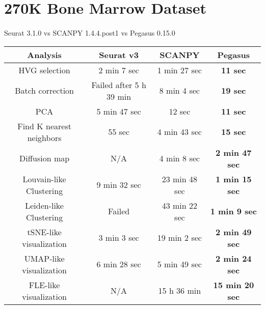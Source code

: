 \documentclass[10pt]{article}
\begin{document}
\section{270K Bone Marrow Dataset}

\paragraph{}
Seurat 3.1.0 \qquad vs \qquad SCANPY 1.4.4.post1 \qquad vs \qquad Pegasus 0.15.0

\begin{table}[H]
	\centering
	\begin{tabular}{|c|c|c|c|}
		\hline
		Analysis & Seurat v3 & SCANPY & Pegasus\\
		\hline \hline
		HVG selection & 2 min 7 sec & 1 min 27 sec & \textbf{11 sec} \\
		\hline
		Batch correction & Failed after 5 h 39 min & 8 min 4 sec & \textbf{19 sec} \\
		\hline
		PCA & 5 min 47 sec & 12 sec & \textbf{11 sec} \\
		\hline
		Find K nearest neighbors &  55 sec &  4 min 43 sec & \textbf{15 sec}\\
		\hline
		Diffusion map & N/A & 4 min 8 sec & \textbf{2 min 47 sec} \\
		\hline
		Louvain-like Clustering & 9 min 32 sec & 23 min 48 sec & \textbf{1 min 15 sec} \\
		\hline 
		Leiden-like Clustering & Failed & 43 min 22 sec & \textbf{1 min 9 sec}\\
		\hline
		tSNE-like visualization & 3 min 3 sec & 19 min 2 sec & \textbf{2 min 49 sec}\\
		\hline
		UMAP-like visualization & 6 min 28 sec & 5 min 49 sec  & \textbf{2 min 24 sec}\\
		\hline
		FLE-like visualization & N/A & 15 h 36 min & \textbf{15 min 20 sec}\\
		\hline
	\end{tabular}
\end{table}
\end{document}
